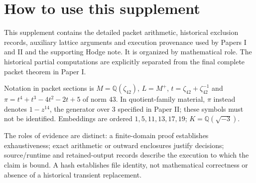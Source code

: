 \section{How to use this supplement}
This supplement contains the detailed packet arithmetic, historical
exclusion records, auxiliary lattice arguments and execution provenance
used by Papers I and II and the supporting Hodge note. It is organized by
mathematical role. The historical partial computations are explicitly
separated from the final complete packet theorem in Paper I.

Notation in packet sections is $M=\mathbb Q(\zeta_{42})$, $L=M^+$,
$t=\zeta_{42}+\zeta_{42}^{-1}$ and
$\pi=t^4+t^3-4t^2-2t+5$ of norm $43$. In quotient-family material,
$\pi$ instead denotes $1-z^{14}$, the generator over $3$ specified in
Paper II; these symbols must not be identified. Embeddings are ordered
$1,5,11,13,17,19$; $K=\mathbb Q(\sqrt{-3})$.

The roles of evidence are distinct: a finite-domain proof establishes
exhaustiveness; exact arithmetic or outward enclosures justify decisions;
source/runtime and retained-output records describe the execution to which
the claim is bound. A hash establishes file identity, not mathematical
correctness or absence of a historical transient replacement.

